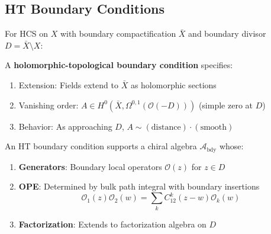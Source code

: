 \subsection{HT Boundary Conditions}

\begin{definition}
For HCS on $X$ with boundary compactification $\bar{X}$ and boundary divisor 
$D = \bar{X} \setminus X$:

A \textbf{holomorphic-topological boundary condition} specifies:
\begin{enumerate}
\item Extension: Fields extend to $\bar{X}$ as holomorphic sections
\item Vanishing order: $A \in H^0(\bar{X}, \Omega^{0,1}(\mathcal{O}(-D)))$ (simple zero at $D$)
\item Behavior: As approaching $D$, $A \sim (\text{distance}) \cdot (\text{smooth})$
\end{enumerate}
\end{definition}

\begin{theorem}
An HT boundary condition supports a chiral algebra $\mathcal{A}_{\text{bdy}}$ whose:
\begin{enumerate}
\item \textbf{Generators}: Boundary local operators $\mathcal{O}(z)$ for $z \in D$
\item \textbf{OPE}: Determined by bulk path integral with boundary insertions
$$\mathcal{O}_1(z) \mathcal{O}_2(w) = \sum_k C_{12}^k(z-w) \mathcal{O}_k(w)$$
\item \textbf{Factorization}: Extends to factorization algebra on $D$
\end{enumerate}
\end{theorem}

